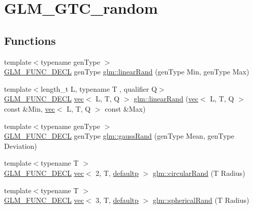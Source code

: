 \hypertarget{group__gtc__random}{}\section{G\+L\+M\+\_\+\+G\+T\+C\+\_\+random}
\label{group__gtc__random}
\subsection*{Functions}
\begin{DoxyCompactItemize}
\item 
{\footnotesize template$<$typename gen\+Type $>$ }\\\mbox{\hyperlink{setup_8hpp_ab2d052de21a70539923e9bcbf6e83a51}{G\+L\+M\+\_\+\+F\+U\+N\+C\+\_\+\+D\+E\+CL}} gen\+Type \mbox{\hyperlink{group__gtc__random_ga04e241ab88374a477a2c2ceadd2fa03d}{glm\+::linear\+Rand}} (gen\+Type Min, gen\+Type Max)
\item 
{\footnotesize template$<$length\+\_\+t L, typename T , qualifier Q$>$ }\\\mbox{\hyperlink{setup_8hpp_ab2d052de21a70539923e9bcbf6e83a51}{G\+L\+M\+\_\+\+F\+U\+N\+C\+\_\+\+D\+E\+CL}} \mbox{\hyperlink{structglm_1_1vec}{vec}}$<$ L, T, Q $>$ \mbox{\hyperlink{group__gtc__random_ga94731130c298a9ff5e5025fdee6d97a0}{glm\+::linear\+Rand}} (\mbox{\hyperlink{structglm_1_1vec}{vec}}$<$ L, T, Q $>$ const \&Min, \mbox{\hyperlink{structglm_1_1vec}{vec}}$<$ L, T, Q $>$ const \&Max)
\item 
{\footnotesize template$<$typename gen\+Type $>$ }\\\mbox{\hyperlink{setup_8hpp_ab2d052de21a70539923e9bcbf6e83a51}{G\+L\+M\+\_\+\+F\+U\+N\+C\+\_\+\+D\+E\+CL}} gen\+Type \mbox{\hyperlink{group__gtc__random_ga5193a83e49e4fdc5652c084711083574}{glm\+::gauss\+Rand}} (gen\+Type Mean, gen\+Type Deviation)
\item 
{\footnotesize template$<$typename T $>$ }\\\mbox{\hyperlink{setup_8hpp_ab2d052de21a70539923e9bcbf6e83a51}{G\+L\+M\+\_\+\+F\+U\+N\+C\+\_\+\+D\+E\+CL}} \mbox{\hyperlink{structglm_1_1vec}{vec}}$<$ 2, T, \mbox{\hyperlink{namespaceglm_a36ed105b07c7746804d7fdc7cc90ff25a9d21ccd8b5a009ec7eb7677befc3bf51}{defaultp}} $>$ \mbox{\hyperlink{group__gtc__random_ga9dd05c36025088fae25b97c869e88517}{glm\+::circular\+Rand}} (T Radius)
\item 
{\footnotesize template$<$typename T $>$ }\\\mbox{\hyperlink{setup_8hpp_ab2d052de21a70539923e9bcbf6e83a51}{G\+L\+M\+\_\+\+F\+U\+N\+C\+\_\+\+D\+E\+CL}} \mbox{\hyperlink{structglm_1_1vec}{vec}}$<$ 3, T, \mbox{\hyperlink{namespaceglm_a36ed105b07c7746804d7fdc7cc90ff25a9d21ccd8b5a009ec7eb7677befc3bf51}{defaultp}} $>$ \mbox{\hyperlink{group__gtc__random_ga22f90fcaccdf001c516ca90f6428e138}{glm\+::spherical\+Rand}} (T Radius)

\end{DoxyCompactItemize}
